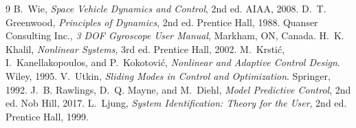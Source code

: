 \documentclass[conference]{IEEEtran}
\begin{document}

\begin{thebibliography}{9}
 B.~Wie, \emph{Space Vehicle Dynamics and Control}, 2nd ed. AIAA, 2008.
 D.~T. Greenwood, \emph{Principles of Dynamics}, 2nd ed. Prentice Hall, 1988.
 Quanser Consulting Inc., \emph{3 DOF Gyroscope User Manual}, Markham, ON, Canada.
 H.~K. Khalil, \emph{Nonlinear Systems}, 3rd ed. Prentice Hall, 2002.
 M.~Krsti\'c, I.~Kanellakopoulos, and P.~Kokotovi\'c, \emph{Nonlinear and Adaptive Control Design}. Wiley, 1995.
 V.~Utkin, \emph{Sliding Modes in Control and Optimization}. Springer, 1992.
 J.~B. Rawlings, D.~Q. Mayne, and M.~Diehl, \emph{Model Predictive Control}, 2nd ed. Nob Hill, 2017.
 L.~Ljung, \emph{System Identification: Theory for the User}, 2nd ed. Prentice Hall, 1999.
\end{thebibliography}
\end{document}
